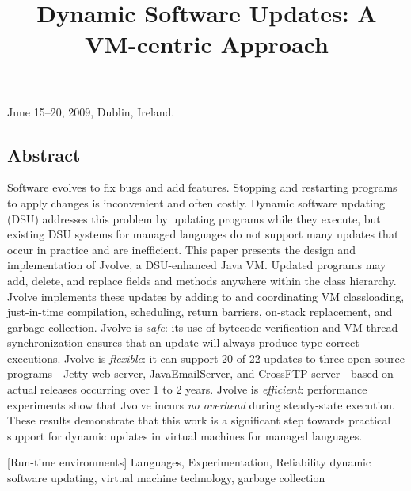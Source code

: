 \documentclass[9pt]{sigplanconf}
\newcommand{\DSU}{{\sc Jvolve}}
\begin{document}
 {June 15--20, 2009, Dublin, Ireland.}

\title{Dynamic Software Updates: A VM-centric Approach}
\maketitle

\subsection*{Abstract}
Software evolves to fix bugs and add features. Stopping and restarting
programs to apply changes is inconvenient and often costly.  Dynamic
software updating (DSU) addresses this problem by updating programs
while they execute, but existing DSU systems for managed languages do
not support many updates that occur in practice and are inefficient.
This paper presents the design and implementation of \DSU, a
DSU-enhanced Java VM.  Updated programs may add, delete, and replace fields
and methods anywhere within the class hierarchy.  \DSU{} implements
these updates by adding to and coordinating VM classloading,
just-in-time compilation, scheduling, return barriers, on-stack
replacement, and garbage collection.  \DSU{} is \emph{safe}: its use
of bytecode verification and VM thread synchronization ensures that an
update will always produce type-correct executions. \DSU{} is
\emph{flexible}: it can support 20 of 22 updates to three
open-source programs---Jetty web server, JavaEmailServer, and CrossFTP
server---based on actual releases occurring over 1 to 2 years.
\DSU{} is \emph{efficient}: performance experiments show that
\DSU{} incurs \emph{no overhead} during steady-state execution.  These
results demonstrate that this work is a significant step towards
practical support for 
dynamic updates in virtual machines for managed languages.


[Run-time environments]
\terms Languages, Experimentation, Reliability
\keywords dynamic software updating, virtual machine technology, garbage collection 
\end{document}
